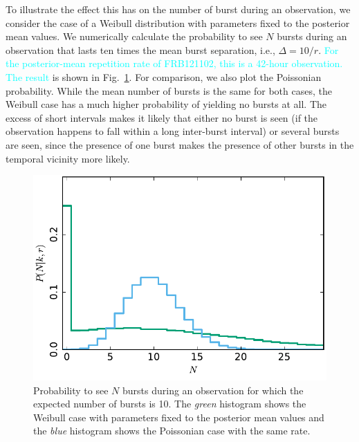 \documentclass[fleqn,usenatbib]{mnras}
\newcommand{\new}[1]{\textcolor{cyan}{#1}}
\begin{document}
To illustrate the effect this has on the number of burst during an observation, we consider the case of a Weibull distribution with parameters fixed to the posterior mean values. We numerically calculate the probability to see $N$ bursts during an observation that lasts ten times the mean burst separation, i.e., $\Delta = 10/r$. \new{For the posterior-mean repetition rate of FRB121102, this is a 42-hour observation. The result} is shown in Fig.~\ref{fig:n_singleint}. For comparison, we also plot the Poissonian probability. While the mean number of bursts is the same for both cases, the Weibull case has a much higher probability of yielding no bursts at all. The excess of short intervals makes it likely that either no burst is seen (if the observation happens to fall within a long inter-burst interval) or several bursts are seen, since the presence of one burst makes the presence of other bursts in the temporal vicinity more likely.

\begin{figure}
	\includegraphics[width=1.0\columnwidth]{n_singleint.pdf}
	\caption{\label{fig:n_singleint}Probability to see $N$ bursts during an observation for which the expected number of bursts is 10. The \emph{green} histogram shows the Weibull case with parameters fixed to the posterior mean values and the \emph{blue} histogram shows the Poissonian case with the same rate.}
\end{figure}
\end{document}
